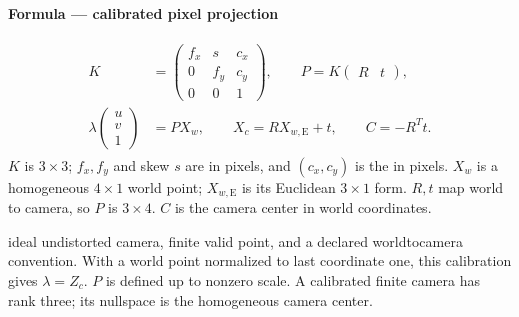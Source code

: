\documentclass[letterpaper,11pt,english,openany,oneside]{jupyterBook}
\begin{document}
\begin{TextbookBox}
\textbf{Formula — calibrated pixel projection}\par\smallskip
\begin{equation}\label{equation:lectures/lecture01/cameras:eq-lec01-camera}
\begin{split}\begin{aligned}
K&=\begin{pmatrix}f_x&s&c_x\\0&f_y&c_y\\0&0&1\end{pmatrix},\qquad
P=K\begin{pmatrix}R&t\end{pmatrix},\\
\lambda\begin{pmatrix}u\\v\\1\end{pmatrix}
&=PX_w,\qquad X_c=RX_{w,\mathrm{E}}+t,\qquad C=-R^Tt.
\end{aligned}\end{split}
\end{equation}
\sphinxAtStartPar
\(K\) is \(3\times3\); \(f_x,f_y\) and skew \(s\) are in pixels, and \((c_x,c_y)\) is the  in pixels. \(X_w\) is a homogeneous \(4\times1\) world point; \(X_{w,\mathrm{E}}\) is its Euclidean \(3\times1\) form. \(R,t\) map world to camera, so \(P\) is \(3\times4\). \(C\) is the camera center in world coordinates.

\sphinxAtStartPar
{} ideal undistorted camera, finite valid point, and a declared world\sphinxhyphen{}to\sphinxhyphen{}camera convention. With a world point normalized to last coordinate one, this calibration gives \(\lambda=Z_c\). \(P\) is defined up to nonzero scale. A calibrated finite camera has rank three; its nullspace is the homogeneous camera center.

\end{TextbookBox}
\end{document}
